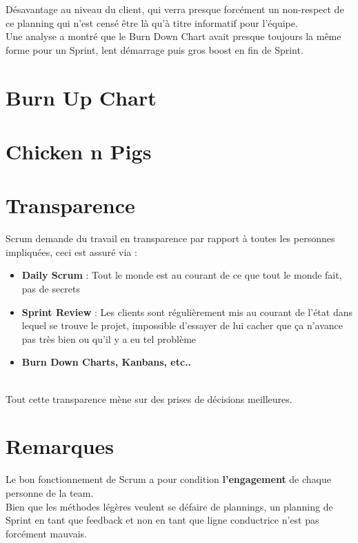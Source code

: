 \documentclass{report}
\begin{document}
		Désavantage au niveau du client, qui verra presque forcément un non-respect de ce planning qui n'est censé être là qu'à titre informatif pour l'équipe.\\

		Une analyse a montré que le Burn Down Chart avait presque toujours la même forme pour un Sprint, lent démarrage puis gros boost en fin de Sprint.\\

	\section{Burn Up Chart}

	\section{Chicken n Pigs}

	\section{Transparence}

		Scrum demande du travail en transparence par rapport à toutes les personnes impliquées, ceci est assuré via : \\ 

		\begin{itemize}
			\item \textbf{Daily Scrum} : Tout le monde est au courant de ce que tout le monde fait, pas de secrets
			\item \textbf{Sprint Review} : Les clients sont régulièrement mis au courant de l'état dans lequel se trouve le projet, impossible d'essayer de lui cacher que ça n'avance pas très bien ou qu'il y a eu tel problème
			\item \textbf{Burn Down Charts, Kanbans, etc..}
		\end{itemize}\\

		Tout cette transparence mène sur des prises de décisions meilleures.\\

	\section{Remarques}

		Le bon fonctionnement de Scrum a pour condition \textbf{l'engagement} de chaque personne de la team.\\

		Bien que les méthodes légères veulent se défaire de plannings, un planning de Sprint en tant que feedback et non en tant que ligne conductrice n'est pas forcément mauvais.\\
\end{document}
